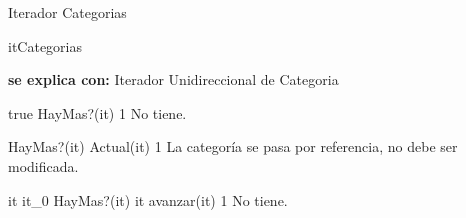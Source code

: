 \begin{interfaz}{Iterador Categorias}
\begin{iparamformales}{itCategorias}


\textbf{\large se explica con:} Iterador Unidireccional de Categoria

\end{iparamformales}

{true}
{\igres HayMas?(it)}
{1}
{No tiene.}

{HayMas?(it)}
{\igres Actual(it)}
{1}
{La categoría se pasa por referencia, no debe ser modificada.}

{it \igobs it_0 \land HayMas?(it)}
{it \igobs avanzar(it)}
{1}
{No tiene.}

\end{interfaz}